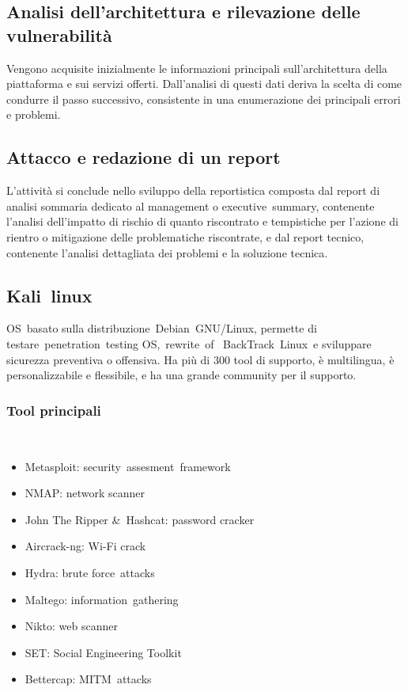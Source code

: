 \documentclass[8pt]{extarticle}
\begin{document}
\subsection{Analisi dell’architettura e rilevazione delle vulnerabilità}
Vengono acquisite inizialmente le informazioni principali sull'architettura della piattaforma e sui servizi 
offerti. Dall'analisi di questi dati deriva la scelta di come condurre il passo successivo, consistente in 
una enumerazione dei principali errori e problemi. 
\subsection{Attacco e redazione di un report}
L'attività si conclude nello sviluppo della reportistica composta dal report di analisi sommaria dedicato 
al management o executive summary, contenente l'analisi dell'impatto di rischio di quanto riscontrato e 
tempistiche per l'azione di rientro o mitigazione delle problematiche riscontrate, e dal report tecnico, 
contenente l'analisi dettagliata dei problemi e la soluzione tecnica. 
\subsection{Kali linux}
OS basato sulla distribuzione Debian GNU/Linux, permette di testare penetration testing OS, rewrite of 
BackTrack Linux e sviluppare sicurezza preventiva o offensiva. Ha più di 300 tool di supporto, è 
multilingua, è personalizzabile e flessibile, e ha una grande community per il supporto.
\subsubsection{Tool principali} 
\begin{itemize}
    \item Metasploit: security assesment framework
    \item NMAP: network scanner 
    \item John The Ripper \& Hashcat: password cracker
    \item Aircrack-ng: Wi-Fi crack
    \item Hydra: brute force attacks
    \item Maltego: information gathering
    \item Nikto: web scanner
    \item SET: Social Engineering Toolkit
    \item Bettercap: MITM attacks 
\end{itemize}
\end{document}
